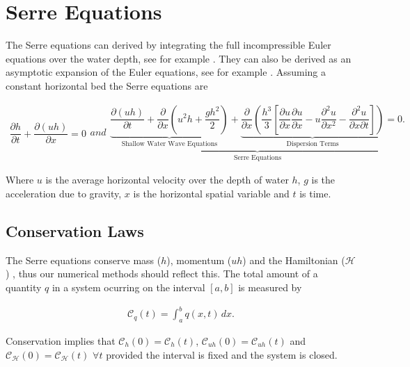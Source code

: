 \documentclass[SingleSpace,12pt,Journal]{Serre_ASCE}
\begin{document}
\section{Serre Equations}
\label{section:Serre Equations}
The Serre equations can derived by integrating the full incompressible Euler equations over the water depth, see for example . They can also be derived as an asymptotic expansion of the Euler equations, see for example . Assuming a constant horizontal bed the Serre equations are \cite{Guyenne-etal-2014-169}
\begin{linenomath*}
\begin{subequations}\label{eq:Serre_nonconservative_form}
\begin{gather}
\dfrac{\partial h}{\partial t} + \dfrac{\partial (uh)}{\partial x} = 0
\label{eq:Serre_continuity}
\end{gather}
and
\begin{gather}
\underbrace{\underbrace{\dfrac{\partial (uh)}{\partial t} + \dfrac{\partial}{\partial x} \left ( u^2h + \dfrac{gh^2}{2}\right )}_{\text{Shallow Water Wave Equations}} + \underbrace{\dfrac{\partial}{\partial x} \left (  \dfrac{h^3}{3} \left [ \dfrac{\partial u }{\partial x} \dfrac{\partial u}{\partial x} - u\dfrac{\partial^2 u}{\partial x^2}  - \dfrac{\partial^2 u}{\partial x \partial t}\right ] \right )}_{\text{Dispersion Terms}} = 0.}_{\text{Serre Equations}}
\label{eq:Serre_momentum}
\end{gather}
\end{subequations}
\end{linenomath*}
Where $u$ is the average horizontal velocity over the depth of water $h$, $g$ is the acceleration due to gravity, $x$ is the horizontal spatial variable and $t$ is time. 

\subsection{Conservation Laws}
The Serre equations conserve mass  ($h$), momentum ($uh$)  and the Hamiltonian ($\mathcal{H}$) \cite{Li-Y-2002,Green-Naghdi-1976-237}, thus our numerical methods should reflect this. The total amount of a quantity $q$ in a system ocurring on the interval $[a,b]$ is measured by
\begin{linenomath*}
\begin{gather*}
\label{eqn:Condef}
\mathcal{C}_q(t) = \int_{a}^{b} q(x,t)\, dx .
\end{gather*}
\end{linenomath*}
Conservation implies that $\mathcal{C}_{h}(0) = \mathcal{C}_{h}(t)$, $\mathcal{C}_{uh}(0) = \mathcal{C}_{uh}(t)$ and $\mathcal{C}_{\mathcal{H}}(0) = \mathcal{C}_{\mathcal{H}}(t)$ $\forall t$ provided the interval is fixed and the system is closed.
\end{document}

